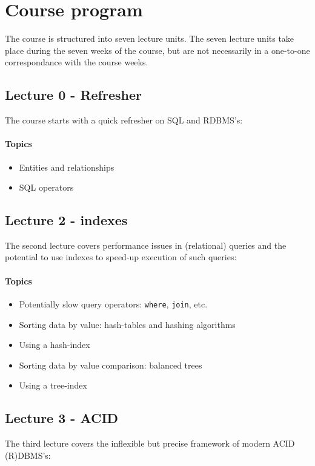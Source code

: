\section{Course program}
	The course is structured into seven lecture units. The seven lecture units take place during the seven weeks of the course, but are not necessarily in a one-to-one correspondance with the course weeks.

	\subsection{Lecture 0 - Refresher}
		The course starts with a quick refresher on SQL and RDBMS's:

		\paragraph*{Topics}
			\begin{itemize}
				\item Entities and relationships
				\item SQL operators
			\end{itemize}


	\subsection{Lecture 2 - indexes}
		The second lecture covers performance issues in (relational) queries and the potential to use indexes to speed-up execution of such queries:

		\paragraph*{Topics}
			\begin{itemize}
				\item Potentially slow query operators: \texttt{where}, \texttt{join}, etc.
				\item Sorting data by value: hash-tables and hashing algorithms
				\item Using a hash-index
				\item Sorting data by value comparison: balanced trees
				\item Using a tree-index
			\end{itemize}


	\subsection{Lecture 3 - ACID}
		The third lecture covers the inflexible but precise framework of modern ACID (R)DBMS's:

